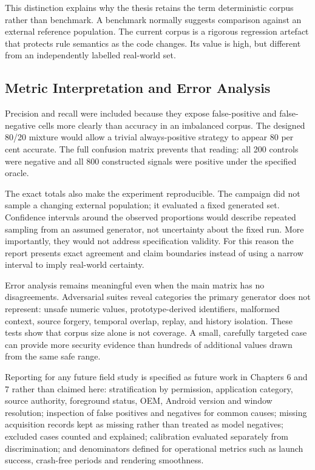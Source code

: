 This distinction explains why the thesis retains the term deterministic corpus rather than benchmark. A benchmark normally suggests comparison against an external reference population. The current corpus is a rigorous regression artefact that protects rule semantics as the code changes. Its value is high, but different from an independently labelled real-world set.

\subsection{Metric Interpretation and Error Analysis}

Precision and recall were included because they expose false-positive and false-negative cells more clearly than accuracy in an imbalanced corpus. The designed 80/20 mixture would allow a trivial always-positive strategy to appear 80 per cent accurate. The full confusion matrix prevents that reading: all 200 controls were negative and all 800 constructed signals were positive under the specified oracle.

The exact totals also make the experiment reproducible. The campaign did not sample a changing external population; it evaluated a fixed generated set. Confidence intervals around the observed proportions would describe repeated sampling from an assumed generator, not uncertainty about the fixed run. More importantly, they would not address specification validity. For this reason the report presents exact agreement and claim boundaries instead of using a narrow interval to imply real-world certainty.

Error analysis remains meaningful even when the main matrix has no disagreements. Adversarial suites reveal categories the primary generator does not represent: unsafe numeric values, prototype-derived identifiers, malformed context, source forgery, temporal overlap, replay, and history isolation. These tests show that corpus size alone is not coverage. A small, carefully targeted case can provide more security evidence than hundreds of additional values drawn from the same safe range.

Reporting for any future field study is specified as future work in Chapters 6 and 7 rather than claimed here: stratification by permission, application category, source authority, foreground status, OEM, Android version and window resolution; inspection of false positives and negatives for common causes; missing acquisition records kept as missing rather than treated as model negatives; excluded cases counted and explained; calibration evaluated separately from discrimination; and denominators defined for operational metrics such as launch success, crash-free periods and rendering smoothness.


